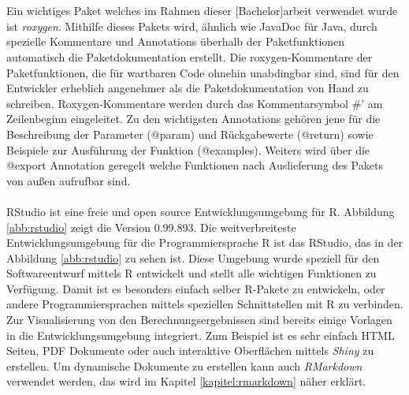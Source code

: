 \\
\\
Ein wichtiges Paket welches im Rahmen dieser [Bachelor]arbeit verwendet wurde ist \emph{roxygen}. Mithilfe dieses Pakets wird, ähnlich wie JavaDoc für Java, durch spezielle Kommentare und Annotations überhalb der Paketfunktionen automatisch die Paketdokumentation erstellt. Die roxygen-Kommentare der Paketfunktionen, die für wartbaren Code ohnehin unabdingbar sind, sind für den Entwickler erheblich angenehmer als die Paketdokumentation von Hand zu schreiben. Roxygen-Kommentare werden durch das Kommentarsymbol #' am Zeilenbeginn eingeleitet. Zu den wichtigsten Annotations gehören jene für die Beschreibung der Parameter (@param) und Rückgabewerte (@return) sowie Beispiele zur Ausführung der Funktion (@examples). Weiters wird über die @export Annotation geregelt welche Funktionen nach Auslieferung des Pakets von außen aufrufbar sind.
\\
\\
RStudio ist eine freie und open source Entwicklungsumgebung für R. Abbildung \ref{abb:rstudio} zeigt die Version 0.99.893.
Die weitverbreiteste Entwicklungsumgebung für die Programmiersprache R ist das RStudio, das in der Abbildung \ref{abb:rstudio} zu sehen ist. Diese Umgebung wurde speziell für den Softwareentwurf mittels R entwickelt und stellt alle wichtigen Funktionen zu Verfügung. Damit ist es besonders einfach selber R-Pakete zu entwickeln, oder andere Programmiersprachen mittels speziellen Schnittstellen mit R zu verbinden. Zur Visualisierung von den Berechnungsergebnissen sind bereits einige Vorlagen in die Entwicklungsumgebung integriert. Zum Beispiel ist es sehr einfach HTML Seiten, PDF Dokumente oder auch interaktive Oberflächen mittels \emph{Shiny} zu erstellen. Um dynamische Dokumente zu erstellen kann auch \emph{RMarkdown} verwendet werden, das wird im Kapitel \ref{kapitel:rmarkdown} näher erklärt.
